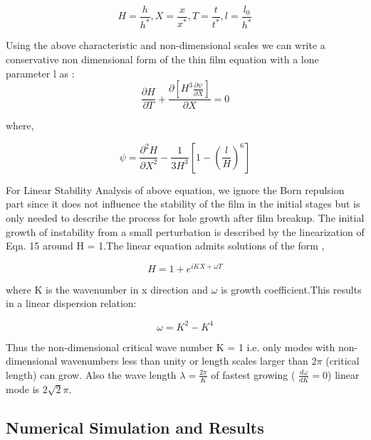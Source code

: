 \documentclass[
manuscript=article]{achemso}
\begin{document}
\begin{equation}
H = \frac{h}{h^{*}}, X = \frac{x}{x^{*}}, T = \frac{t}{t^{*}}, l = \frac{l_{0}}{h^{*}}
\end{equation}

Using the above characteristic and non-dimensional scales we can write a conservative non dimensional form of the thin film equation with a lone parameter l as :
 \begin{equation}
 \frac{\partial{H}}{\partial{T}} + \frac{\partial{\left[H^{3}\frac{\partial{\psi}}{\partial{X}}\right]}}{\partial{X}} = 0
 \end{equation}
 
 where,
 
 \begin{equation}
 \psi = \frac{\partial^{2}{H}}{\partial{X^{2}}} - \frac{1}{3 H^{3}}\left[1 - \left(\frac{l}{H}\right)^{6} \right] 
 \end{equation}
 
 For Linear Stability Analysis of above equation, we ignore the Born repulsion part since it does not influence the stability of the film in the initial stages but is only needed to describe the process for hole growth after film breakup. The initial growth of instability from a small perturbation is described by the linearization of Eqn. 15 around H = 1.The linear equation admits solutions of the form ,
 
 \begin{equation}
 H = 1 + e^{iKX + \omega T}
 \end{equation}
 
 where K is the wavenumber in x direction and $ \omega $ is growth coefficient.This results in a linear dispersion relation:
 
 \begin{equation}
 \omega = K^2 - K^4
 \end{equation}
 
 Thus the non-dimensional critical wave number K = 1 i.e. only modes with non-dimensional wavenumbers less than unity or length scales larger than $ 2 \pi $ (critical length) can grow. Also the wave length $ \lambda = \frac{2 \pi}{K } $ of fastest growing ( $ \frac{d \omega}{dK} = 0 $) linear mode is $ 2 \sqrt{2} \pi $.
 
 

\subsection{Numerical Simulation and Results}
\end{document}
